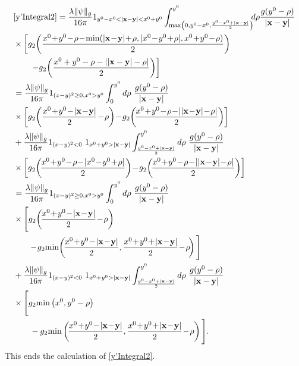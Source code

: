 \documentclass[b5paper,draft,openbib,12pt]{memoir}
\newcommand{\vx}{\mathbf{x}}
\newcommand{\vy}{\mathbf{y}}
\begin{document}
\begin{align}
    &\eqref{y'Integral2}=\frac{\lambda\|\psi\|_g}{16\pi} 1_{y^0-x^0<|\vx-\vy|<x^0+y^0} \int_{\max \left(0,y^0-x^0, \frac{y^0-x^0+|\vx-\vy|}{2} \right)}^{y^0} \!\!\!d\rho \frac{g(y^0-\rho)}{|\vx-\vy|}\nonumber\\
    &\times \left[g_2\!\left(\frac{x^0\!+\!y^0\!-\!\rho\!-\!\min(|\vx\!-\!\vy|\!+\!\rho,|x^0\!-\!y^0\!+\!\rho|,x^0\!+\!y^0\!-\!\rho)}{2} \right)\right.\nonumber\\
    &\left.\quad\quad  -g_2\!\left( \frac{x^0+y^0-\rho-||\vx-\vy|-\rho|}{2} \right) \right] \nonumber\\
    &= \frac{\lambda \|\psi\|_g}{16\pi} 1_{(x-y)^2\ge0, x^0>y^0} \int_{0}^{y^0} d\rho  ~\frac{ g(y^0-\rho)}{|\vx-\vy|}\nonumber\\
    &\times\left[ g_2\!\left(\frac{x^0\!+\!y^0 \!-\! |\vx\!-\!\vy|}{2}\!-\!\rho\right)
    \!-\!g_2\!\left(\!\frac{x^0\!+\!y^0\!-\!\rho \!-\! ||\vx\!-\!\vy|\!-\!\rho|}{2}\right)\right]\nonumber\\
    &+ \frac{\lambda \|\psi\|_g}{16\pi} 1_{(x-y)^2<0}~1_{ x^0+y^0>|\vx-\vy|} \int_{\frac{y^0-x^0+|\vx-\vy|}{2}}^{y^0} d\rho  ~\frac{ g(y^0-\rho)}{|\vx-\vy|}\nonumber\\
    &\times \left[ g_2\!\left(\!\frac{x^0\!+\!y^0\!-\!\rho \!-\! |x^0\!-\!y^0\!+\!\rho|}{2}\right)
    \!-\!g_2\!\left(\!\frac{x^0\!+\!y^0\!-\!\rho \!-\! ||\vx\!-\!\vy|\!-\!\rho|}{2}\right)\right]\nonumber\\
    &= \frac{\lambda \|\psi\|_g}{16\pi} 1_{(x-y)^2\ge0, x^0>y^0} \int_{0}^{y^0} d\rho  ~\frac{ g(y^0-\rho)}{|\vx-\vy|}\nonumber\\
    &\times \Bigg[ g_2\!\left(\!\frac{x^0\!+\!y^0 \!-\! |\vx\!-\!\vy|}{2}\!-\!\rho\right)\\
    &\quad \quad \!-\!g_2\!\min\!\left(\!\frac{x^0\!+\!y^0 \!-\! |\vx\!-\!\vy|}{2},\frac{x^0\!+\!y^0 \!+\! |\vx\!-\!\vy|}{2}\!-\!\rho\!\right)\Bigg]\nonumber\\
    &+ \frac{\lambda \|\psi\|_g}{16\pi} 1_{(x-y)^2<0}~1_{ x^0+y^0>|\vx-\vy|} \int_{\frac{y^0-x^0+|\vx-\vy|}{2}}^{y^0} d\rho ~ \frac{ g(y^0-\rho)}{|\vx-\vy|}\nonumber\\
    &\times \Bigg[ g_2\!\min\left(x^0,y^0-\rho\right)\notag\\
    &\quad \quad -g_2\!\min\left(\!\frac{x^0\!+\!y^0\!-\! |\vx\!-\!\vy|}{2},\frac{x^0\!+\!y^0\!+\! |\vx\!-\!\vy|}{2}\!-\!\rho\right)\Bigg].
\label{eq:resulty'Integral2}
\end{align}
This ends the calculation of \eqref{y'Integral2}. 
\end{document}
